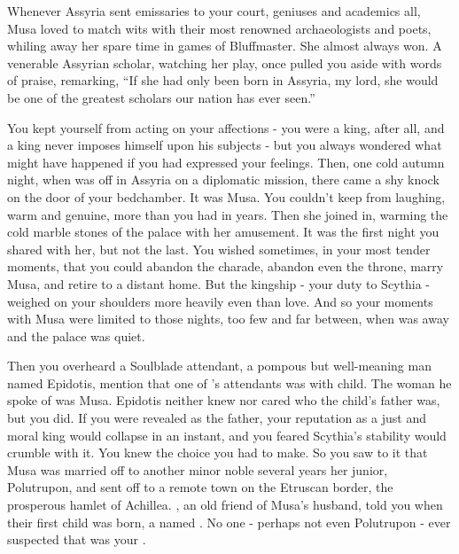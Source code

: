 \documentclass[char]{Kos}
\begin{document}
Whenever Assyria sent emissaries to your court, geniuses and academics all, Musa loved to match wits with their most renowned archaeologists and poets, whiling away her spare time in games of Bluffmaster. She almost always won. A venerable Assyrian scholar, watching her play, once pulled you aside with words of praise, remarking, ``If she had only been born in Assyria, my lord, she would be one of the greatest scholars our nation has ever seen.''

You kept yourself from acting on your affections - you were a king, after all, and a king never imposes himself upon his subjects - but you always wondered what might have happened if you had expressed your feelings. Then, one cold autumn night, when \cScythiaQueen{} was off in Assyria on a diplomatic mission, there came a shy knock on the door of your bedchamber. It was Musa. You couldn't keep from laughing, warm and genuine, more than you had in years. Then she joined in, warming the cold marble stones of the palace with her amusement. It was the first night you shared with her, but not the last. You wished sometimes, in your most tender moments, that you could abandon the charade, abandon even the throne, marry Musa, and retire to a distant home. But the kingship - your duty to Scythia - weighed on your shoulders more heavily even than love. And so your moments with Musa were limited to those nights, too few and far between, when \cScythiaQueen{} was away and the palace was quiet.

Then you overheard a Soulblade attendant, a pompous but well-meaning man named Epidotis, mention that one of \cScythiaQueen{}'s attendants was with child. The woman he spoke of was Musa. Epidotis neither knew nor cared who the child's father was, but you did. If you were revealed as the father, your reputation as a just and moral king would collapse in an instant, and you feared Scythia's stability would crumble with it. You knew the choice you had to make. So you saw to it that Musa was married off to another minor noble several years her junior, Polutrupon, and sent off to a remote town on the Etruscan border, the prosperous hamlet of Achillea. \cScythiaQueen{}, an old friend of Musa's husband, told you when their first child was born, a \cWard{\offspring} named \cWard{}. No one - perhaps not even Polutrupon - ever suspected that \cWard{} was your \cWard{\offspring}.
\end{document}
